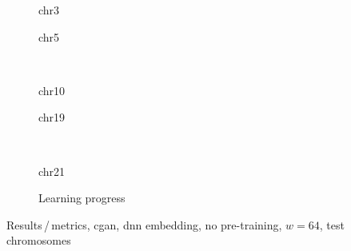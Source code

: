 \begin{figure}[p] %
    \begin{subfigure}{0.45\textwidth}
        \scriptsize
        \caption{chr3}
    \end{subfigure} \hfill
    \begin{subfigure}{0.45\textwidth}
        \scriptsize
        \caption{chr5}
    \end{subfigure}\\[5mm]
    \begin{subfigure}{0.45\textwidth}
        \scriptsize
        \caption{chr10}
    \end{subfigure}\hfill
    \begin{subfigure}{0.45\textwidth}
        \scriptsize
        \caption{chr19}
    \end{subfigure}\\[3mm]
    \begin{subfigure}{0.45\textwidth}
        \scriptsize
        \caption{chr21}
    \end{subfigure} \hfill
    \begin{subfigure}{0.45\textwidth}
        \scriptsize
        \caption{Learning progress} \label{fig:results:GAN64-dnn_lossEpochs}
    \end{subfigure}
    \caption{Results\,/\,metrics, \acrshort{cgan}, \acrshort{dnn} embedding, no pre-training, $w=64$, test chromosomes}   \label{fig:results:GAN64-dnn_pearson}
\end{figure}
